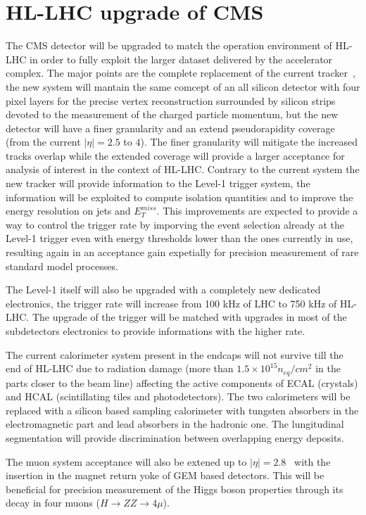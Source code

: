 \section{HL-LHC upgrade of CMS}
\label{upgrade_cms}
The CMS detector will be upgraded to match the operation environment of HL-LHC in order to fully exploit the
larger dataset delivered by the accelerator complex.
The major points are the complete replacement of the current tracker~\cite{trk_phase2_tdr}, the new system will mantain
the same comcept of an all silicon detector with four pixel layers for the precise vertex reconstruction
surrounded by silicon strips devoted to the measurement of the charged particle momentum, but the new detector
will have a finer granularity and an extend pseudorapidity coverage (from the current $|\eta|=2.5$ to $4$).
The finer granularity will mitigate the increased tracks overlap while the extended coverage will provide
a larger acceptance for analysis of interest in the context of HL-LHC.
Contrary to the current system the new tracker will provide information to the Level-1 trigger system,
the information will be exploited to compute isolation quantities and to improve the energy resolution on jets
and $E_T^{miss}$. This improvements are expected to provide a way to control the trigger rate
by imporving the event selection already at the Level-1 trigger even with energy thresholds lower than the ones
currently in use, resulting again in an acceptance gain expetially for precision measurement of rare standard
model processes.

The Level-1 itself will also be upgraded with a completely new dedicated electronics, the trigger rate
will increase from 100 kHz of LHC to 750 kHz of HL-LHC. The upgrade of the trigger will be matched with
upgrades in most of the subdetectors electronics to provide informations with the higher rate.

The current calorimeter system present in the endcaps will not survive till the end of HL-LHC due to radiation
damage (more than $1.5\times10^{15} n_{eq}/cm^{2}$ in the parts closer to the beam line) affecting the active components of
ECAL (\PbWO crystals) and HCAL (scintillating tiles and photodetectors).
The two calorimeters will be replaced with a silicon based sampling calorimeter with tungsten absorbers in the
electromagnetic part and lead absorbers in the hadronic one. The lungitudinal segmentation will provide
discrimination between overlapping energy deposits.

The muon system acceptance will also be extened up to $|\eta| = 2.8$~\cite{muon_phase2_tdr} with the insertion in
the magnet return yoke of GEM based detectors. This will be beneficial for precision measurement of the Higgs boson
properties through its decay in four muons ($H\to ZZ\to 4 \mu$).

